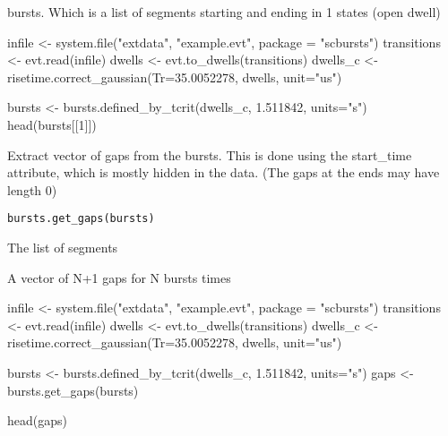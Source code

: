 \documentclass[letterpaper]{book}
\begin{document}
%
\begin{Value}
bursts. Which is a list of segments
starting and ending in 1 states (open dwell)
\end{Value}
%
\begin{Examples}
\begin{ExampleCode}

infile <- system.file("extdata", "example.evt", package = "scbursts")
transitions <- evt.read(infile)
dwells <- evt.to_dwells(transitions)
dwells_c <- risetime.correct_gaussian(Tr=35.0052278, dwells, unit="us")

bursts <- bursts.defined_by_tcrit(dwells_c, 1.511842, units="s")
head(bursts[[1]])

\end{ExampleCode}
\end{Examples}
%
\begin{Description}\relax
Extract vector of gaps from the bursts. This is done using the start\_time attribute, which is mostly hidden in the data. (The gaps at the ends may have length 0)
\end{Description}
%
\begin{Usage}
\begin{verbatim}
bursts.get_gaps(bursts)
\end{verbatim}
\end{Usage}
%
\begin{Arguments}
\begin{ldescription}
\item[\code{bursts}] The list of segments
\end{ldescription}
\end{Arguments}
%
\begin{Value}
A vector of N+1 gaps for N bursts times
\end{Value}
%
\begin{Examples}
\begin{ExampleCode}
infile <- system.file("extdata", "example.evt", package = "scbursts")
transitions <- evt.read(infile)
dwells <- evt.to_dwells(transitions)
dwells_c <- risetime.correct_gaussian(Tr=35.0052278, dwells, unit="us")

bursts <- bursts.defined_by_tcrit(dwells_c, 1.511842, units="s")
gaps <- bursts.get_gaps(bursts)

head(gaps)
\end{ExampleCode}
\end{Examples}
\end{document}
